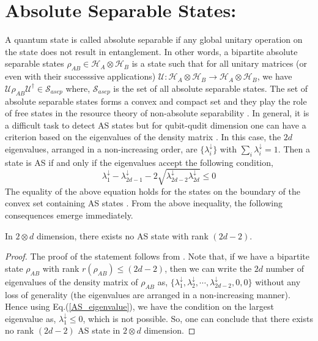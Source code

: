 \section{Absolute Separable States:}
A quantum state is called absolute separable if any global unitary operation on the state does not result in entanglement. In other words, a bipartite absolute separable states  $\rho_{AB} \in \mathcal{H}_A \otimes \mathcal{H}_B$ is a state such that for all unitary matrices (or even with their successsive applications) $\mathcal{U} : \mathcal{H}_A \otimes \mathcal{H}_B \longrightarrow \mathcal{H}_A \otimes \mathcal{H}_B$, we have $\mathcal{U} \rho_{AB} \mathcal{U}^\dagger \in \mathcal{S}_{asep}$ where, $\mathcal{S}_{asep}$ is the set of all absolute separable states. The set of absolute separable states forms a convex and compact set \cite{GCM_14} and they play the role of free states in the resource theory of non-absolute separability \cite{PMD_22}. In general, it is a difficult task to detect AS states but for qubit-qudit dimension one can have a criterion based on the eigenvalues of the density matrix \cite{Hi_07, S_09, J_13}. In this case, the $2d$ eigenvalues, arranged in a non-increasing order, are $\{\lambda_i^{\downarrow}\}$ with $\sum_i \lambda_i^{\downarrow} =1$. Then a state is AS if and only if the eigenvalues accept the following condition,
\begin{equation}
    \lambda_1^{\downarrow} - \lambda_{2d-1}^{\downarrow} - 2\sqrt{\lambda_{2d-2}^{\downarrow} \lambda_{2d}^{\downarrow}} \leq 0
    \label{AS_eigenvalue}
\end{equation}
The equality of the above equation holds for the states on the boundary of the convex set containing AS states \cite{HMD_21}. From the above inequality, the following consequences emerge immediately. 
\begin{prop}
    In $2\otimes d$ dimension, there exists no AS state with rank $(2d-2)$. \cite{HMD_21}
    \label{prop1}
\end{prop}
\begin{proof}
    The proof of the statement follows from \cite{HMD_21}. Note that, if we have a bipartite state $\rho_{AB}$ with rank $r(\rho_{AB}) \leq (2d-2)$, then we can write the $2d$ number of eigenvalues of the density matrix of $\rho_{AB}$ as, $\{\lambda_1^{\downarrow}, \lambda_2^{\downarrow}, \cdots, \lambda_{2d-2}^{\downarrow}, 0, 0\}$ without any loss of generality (the eigenvalues are arranged in a non-increasing manner). Hence using Eq.(\ref{AS_eigenvalue}), we have the condition on the largest eigenvalue as, $\lambda_1^{\downarrow} \leq 0$, which is not possible. So, one can conclude that there exists no rank $(2d-2)$ AS state in $2\otimes d$ dimension.
\end{proof}
